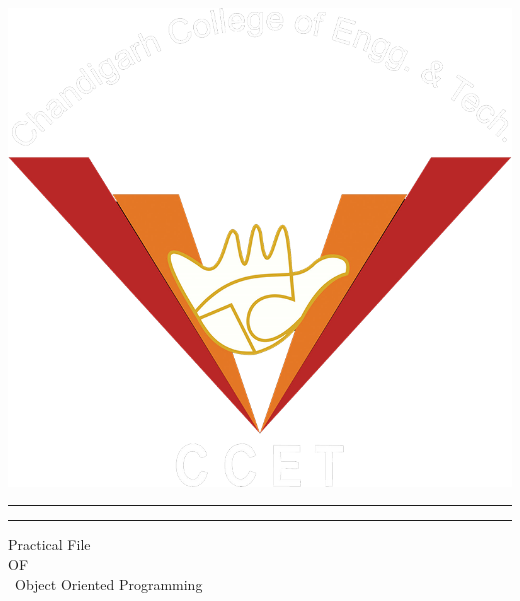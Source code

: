 \documentclass[a4paper, 11pt, oneside]{book} %
\begin{document}
 

\begin{titlepage} %

	\begin{center}
   \includegraphics[scale=0.2]{ccet.png}
\end{center}

	\centering %
	
	\scshape %
	
	\vspace*{\baselineskip} %
	
	
	\rule{\textwidth}{1.6pt}\vspace*{-\baselineskip}\vspace*{2pt} %
	\rule{\textwidth}{0.4pt} %
	
	\vspace{0.75\baselineskip} %
	
	{\LARGE Practical File\\ OF\\ \ Object Oriented Programming\\} %
	

\end{titlepage}
\end{document}
